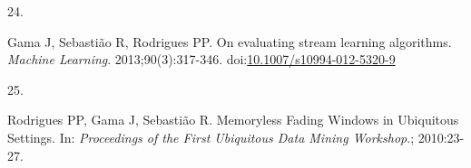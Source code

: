 \documentclass[12pt,twoside]{reedthesis}
\newlength{\csllabelwidth}
\newlength{\cslhangindent}
\newenvironment{CSLReferences}[2] %
 {%
  \setlength{\parindent}{0pt}
  \ifodd #1 \everypar{\setlength{\hangindent}{\cslhangindent}}\ignorespaces\fi
  \ifnum #2 > 0
  \setlength{\parskip}{#2\baselineskip}
  \fi
 }%
 {}
\newcommand{\CSLLeftMargin}[1]{\parbox[t]{\csllabelwidth}{#1}}
\newcommand{\CSLRightInline}[1]{\parbox[t]{\linewidth - \csllabelwidth}{#1}}
\begin{document}
\begin{CSLReferences}{0}{0}
\leavevmode{}%
\CSLLeftMargin{24. }
\CSLRightInline{Gama J, Sebastião R, Rodrigues PP. {On evaluating stream learning algorithms}. \emph{Machine Learning}. 2013;90(3):317-346. doi:\href{https://doi.org/10.1007/s10994-012-5320-9}{10.1007/s10994-012-5320-9}}

\leavevmode{}%
\CSLLeftMargin{25. }
\CSLRightInline{Rodrigues PP, Gama J, Sebastião R. {Memoryless Fading Windows in Ubiquitous Settings}. In: \emph{Proceedings of the First Ubiquitous Data Mining Workshop}.; 2010:23-27.}

\end{CSLReferences}

\end{document}
